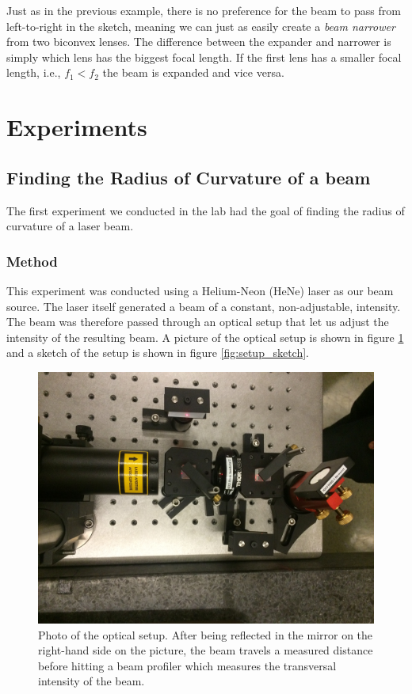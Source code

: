 \documentclass[a4paper, 11pt, notitlepage, english]{article}
\begin{document}
Just as in the previous example, there is no preference for the beam to pass from left-to-right in the sketch, meaning we can just as easily create a \emph{beam narrower} from two biconvex lenses. The difference between the expander and narrower is simply which lens has the biggest focal length. If the first lens has a smaller focal length, i.e., $f_1 < f_2$ the beam is expanded and vice versa.

\clearpage

\section{Experiments}

\subsection{Finding the Radius of Curvature of a beam}

The first experiment we conducted in the lab had the goal of finding the radius of curvature of a laser beam. 

\subsubsection{Method}

This experiment was conducted using a Helium-Neon (HeNe) laser as our beam source. The laser itself generated a beam of a constant, non-adjustable, intensity. The  beam was therefore passed through an optical setup that let us adjust the intensity of the resulting beam. A picture of the optical setup is shown in figure \ref{fig:setup_photo} and a sketch of the setup is shown in figure \ref{fig:setup_sketch}.

\begin{figure}[p]
\includegraphics[width=\textwidth, angle=180]{oppsett_photo}	
\caption{Photo of the optical setup. After being reflected in the mirror on the right-hand side on the picture, the beam travels a measured distance before hitting a beam profiler which measures the transversal intensity of the beam. \label{fig:setup_photo}}
\end{figure}
\end{document}

